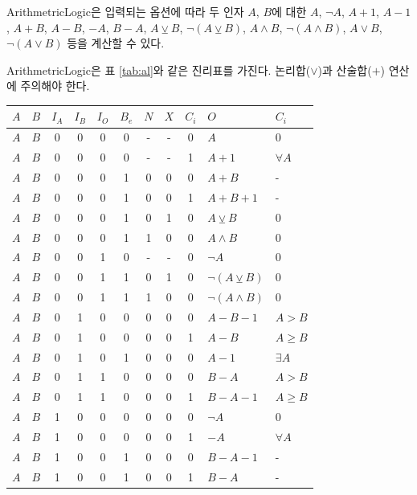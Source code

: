 \documentclass{article}
\renewcommand{\tablename}{표}
\begin{document}
ArithmetricLogic은 입력되는 옵션에 따라 두 인자 $A$, $B$에 대한
$A$, $\neg A$, $A+1$, $A-1$, $A+B$, $A-B$, $-A$, $B-A$,
$A \veebar B$, $\neg(A \veebar B)$, $A\wedge B$, $\neg (A \wedge B)$, $A \vee B$, $\neg(A \vee B)$ 등을
계산할 수 있다.

ArithmetricLogic은 \tablename{} \ref{tab:al}와 같은 진리표를 가진다.
논리합($\vee$)과 산술합($+$) 연산에 주의해야 한다.

\begin{table}[p]
    \centering
    \begin{tabular}{cc|ccccccc|ll}
        $A$ & $B$ & $I_A$ & $I_B$ & $I_O$ & $B_e$ & $N$ & $X$ & $C_i$ & $O$ & $C_i$ \\
        \hline
        $A$ & $B$ & 0 & 0 & 0 & 0 & - & - & 0 & $A$ & 0 \\
        $A$ & $B$ & 0 & 0 & 0 & 0 & - & - & 1 & $A + 1$ & $\forall A$ \\
        $A$ & $B$ & 0 & 0 & 0 & 1 & 0 & 0 & 0 & $A + B$ & - \\
        $A$ & $B$ & 0 & 0 & 0 & 1 & 0 & 0 & 1 & $A + B + 1$ & - \\
        $A$ & $B$ & 0 & 0 & 0 & 1 & 0 & 1 & 0 & $A \veebar B$ & 0 \\
        $A$ & $B$ & 0 & 0 & 0 & 1 & 1 & 0 & 0 & $A \wedge B$ & 0 \\
        $A$ & $B$ & 0 & 0 & 1 & 0 & - & - & 0 & $\neg A$ & 0 \\
        $A$ & $B$ & 0 & 0 & 1 & 1 & 0 & 1 & 0 & $\neg(A \veebar B)$ & 0 \\
        $A$ & $B$ & 0 & 0 & 1 & 1 & 1 & 0 & 0 & $\neg(A \wedge B)$ & 0 \\
        $A$ & $B$ & 0 & 1 & 0 & 0 & 0 & 0 & 0 & $A - B - 1$ & $A > B$\\
        $A$ & $B$ & 0 & 1 & 0 & 0 & 0 & 0 & 1 & $A - B$ & $A \geq B$\\
        $A$ & $B$ & 0 & 1 & 0 & 1 & 0 & 0 & 0 & $A - 1$ & $\exists A$\\
        $A$ & $B$ & 0 & 1 & 1 & 0 & 0 & 0 & 0 & $B - A$ & $A > B$\\
        $A$ & $B$ & 0 & 1 & 1 & 0 & 0 & 0 & 1 & $B - A - 1$ & $A \geq B$\\
        $A$ & $B$ & 1 & 0 & 0 & 0 & 0 & 0 & 0 & $\neg A$ & 0 \\
        $A$ & $B$ & 1 & 0 & 0 & 0 & 0 & 0 & 1 & $-A$ & $\forall A$ \\
        $A$ & $B$ & 1 & 0 & 0 & 1 & 0 & 0 & 0 & $B - A - 1$ & - \\
        $A$ & $B$ & 1 & 0 & 0 & 1 & 0 & 0 & 1 & $B - A$ & - \\

\end{tabular}
\end{table}
\end{document}
